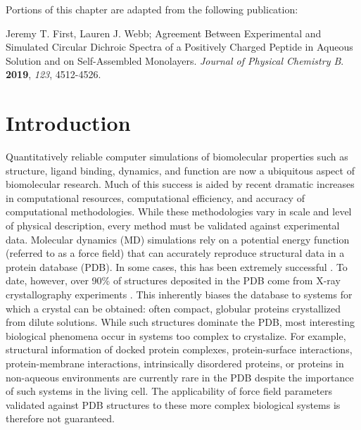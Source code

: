 Portions of this chapter are adapted from the following publication: 

\noindent Jeremy T. First, Lauren J. Webb; Agreement Between Experimental and Simulated Circular Dichroic Spectra of a Positively Charged Peptide in Aqueous Solution and on Self-Assembled Monolayers. \emph{Journal of Physical Chemistry B}. \textbf{2019}, \emph{123}, 4512-4526.

\section{Introduction}

Quantitatively reliable computer simulations of biomolecular properties such as structure, ligand binding, dynamics, and function are now a ubiquitous aspect of biomolecular research. 
Much of this success is aided by recent dramatic increases in computational resources, computational efficiency, and accuracy of computational methodologies. 
While these methodologies vary in scale and level of physical description, every method must be validated against experimental data. 
Molecular dynamics (MD) simulations rely on a potential energy function (referred to as a force field) that can accurately reproduce structural data in a protein database (PDB). 
In some cases, this has been extremely successful \cite{Duan1998, Lindorff-Larsen2011, Bowman2011, Voelz2012, Shaw2010, Lane2013, Koukos2014a}.
To date, however, over 90\% of structures deposited in the PDB come from X-ray crystallography experiments \cite{Berman2000}. 
This inherently biases the database to systems for which a crystal can be obtained: often compact, globular proteins crystallized from dilute solutions. 
While such structures dominate the PDB, most interesting biological phenomena occur in systems too complex to crystalize. 
For example, structural information of docked protein complexes, protein-surface interactions, protein-membrane interactions, intrinsically disordered proteins, or proteins in non-aqueous environments are currently rare in the PDB\cite{Berman2013} despite the importance of such systems in the living cell. 
The applicability of force field parameters validated against PDB structures to these more complex biological systems is therefore not guaranteed.

